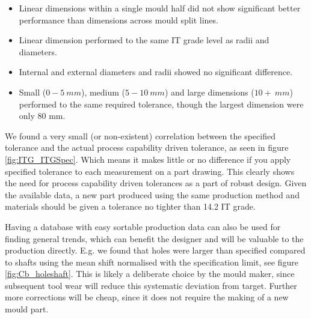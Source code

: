 \documentclass[aip,amsmath, reprint, author-year]{revtex4-1}
\begin{document}
\begin{itemize}
\item Linear dimensions within a single mould half did not show significant better performance than dimensions across mould split lines. 
\item Linear dimension performed to the same IT grade level as radii and diameters.
\item Internal and external diameters and radii showed no significant difference.
\item Small ($0-5 \ mm$), medium ($5-10 \ mm$) and large dimensions ($10+ \ mm$) performed to the same required tolerance, though the largest dimension were only 80 mm.
\end{itemize}

We found a very small (or non-existent) correlation between the specified tolerance and the actual process capability driven tolerance, as seen in figure \ref{fig:ITG_ITGSpec}. Which means it makes little or no difference if you apply specified tolerance to each measurement on a part drawing. This clearly shows the need for process capability driven tolerances as a part of robust design. Given the available data, a new part produced using the same production method and materials should be given a tolerance no tighter than 14.2 IT grade. 

Having a database with easy sortable production data can also be used for finding general trends, which can benefit the designer and will be valuable to the production directly. 
E.g. we found that holes were larger than specified compared to shafts using the mean shift normalised with the specification limit, see figure \ref{fig:Cb_holeshaft}. 
This is likely a deliberate choice by the mould maker, since subsequent tool wear will reduce this systematic deviation from target. Further more corrections will be cheap, since it does not require the making of a new mould part. 
\end{document}

